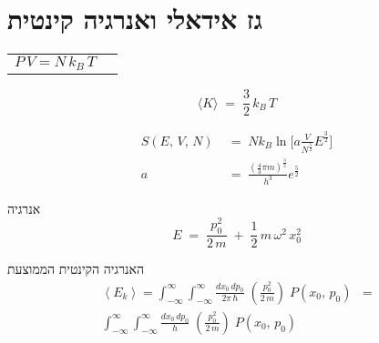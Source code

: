 \section{גז אידאלי ואנרגיה קינטית}

\begin{cheatformula}
\begin{center}
\begin{tabular}{lr}
    $\displaystyle P\,V = N\,k_{B}\,T$ 
    & 
    \scalebox{0.6}{$
    \begin{aligned}
        [P] &= 1\,\mathrm{atm} = 1.013 \times 10^{5}\,\mathrm{Pa} \\
        [V] &= 10^{3}\,\mathrm{L} = 1\,\mathrm{m^{3}} \\
        [T] &= \mathrm{K}
    \end{aligned}$}
\end{tabular}
\end{center}
\end{cheatformula}

\begin{cheatformula}
$$\bigl\langle K \bigr\rangle \;=\;\frac{3}{2}\,k_{B}\,T$$
\end{cheatformula}

\begin{cheatformula}
    \begin{align*}
S(E,\,V,\,N)
\;&=\;
Nk_B\ln \Big[ a \frac{V}{N^\tfrac{5}{2}} E^\tfrac{3}{2} \Big] \\
a \;&=\; \frac{\left( \frac{4}{3} \pi m \right)^\tfrac{3}{2}}{h^3} e^\tfrac{5}{2}
    \end{align*}
    

\end{cheatformula}

\begin{cheatformula} אנרגיה
$$E \;=\; \frac{p_{0}^{2}}{2\,m} \;+\; \frac{1}{2}\,m\,\omega^{2}\,x_{0}^{2}$$

האנרגיה הקינטית הממוצעת
\begin{align*}
\left\langle E_k \right\rangle = \int_{-\infty}^{\infty}\!\int_{-\infty}^{\infty}
\frac{dx_{0}\,dp_{0}}{2\pi\,\hbar}\;
\left(\frac{p_{0}^{2}}{2\,m}\right)\;P(x_{0},\,p_{0})
&= \\
\int_{-\infty}^{\infty}\!\int_{-\infty}^{\infty}
\frac{dx_{0}\,dp_{0}}{h}\;
\left(\frac{p_{0}^{2}}{2\,m}\right)\;P(x_{0},\,p_{0}) 
\end{align*}


\end{cheatformula}
